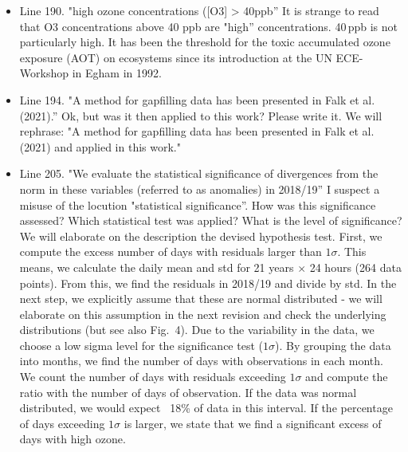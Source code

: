 \documentclass{scrartcl}
\begin{document}
\begin{itemize}
\item {\color{blue}Line 190. "high ozone concentrations ([O3] > 40ppb” It is strange to read that O3 concentrations above 40 ppb are "high” concentrations.}
40\,ppb is not particularly high. It has been the threshold for the toxic accumulated ozone exposure (AOT) on ecosystems since its introduction at the UN ECE-Workshop in Egham in 1992.

\item {\color{blue}Line 194. "A method for gapfilling data has been presented in Falk et al. (2021).”
Ok, but was it then applied to this work? Please write it.}
We will rephrase: "A method for gapfilling data has been presented in Falk et al. (2021) and applied in this work."

\item {\color{blue}Line 205. "We evaluate the statistical significance of divergences from the norm in these variables (referred to as anomalies) in 2018/19”
I suspect a misuse of the locution "statistical significance”. How was this significance assessed? Which statistical test was applied? What is the level of significance?}
We will elaborate on the description the devised hypothesis test. First, we compute the excess number of days with residuals larger than $1\sigma$. This means, we calculate the daily mean and std for 21 years $\times$ 24 hours (264 data points).
From this, we find the residuals in 2018/19 and divide by std. In the next step, we explicitly assume that these are normal distributed - we will elaborate on this assumption in the next revision and check the underlying distributions (but see also Fig.~4). Due to the variability in the data, we choose a low sigma level for the significance test ($1\sigma$). By grouping the data into months, we find the number of days with observations in each month. We count the number of days with residuals exceeding $1\sigma$ and compute the ratio with the number of days of observation. If the data was normal distributed, we would expect ~18\% of data in this interval. If the percentage of days exceeding $1\sigma$ is larger, we state that we find a significant excess of days with high ozone.


\end{itemize}
\end{document}
